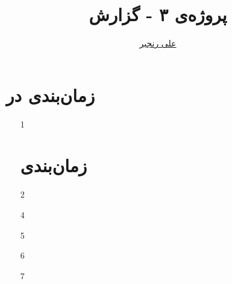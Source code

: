 \documentclass[logo=images/logo.png]{tehranReport}
\title{پروژه‌ی ۳ - گزارش}
\author{\href{mailto:ranjbar.ali@ut.ac.ir?subject=[OS\%20S99 L1]\%20}{علی رنجبر}}
\begin{document}
	\maketitlepage
	\section*{زمان‌بندی در }
	\begin{enumerate}
		\item[1]
		
		
	\section*{زمان‌بندی}
		\item[2]
		
		\item[4]
		
		\item[5]
		
		\item[6]
		
		\item[7]
		
	\end{enumerate}
	
\end{document}
